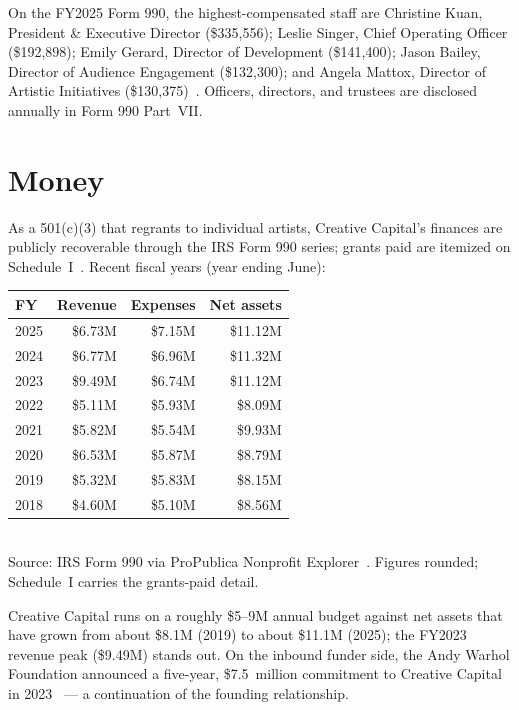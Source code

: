 \documentclass[10pt,letterpaper,twocolumn]{article}
\begin{document}
On the FY2025 Form 990, the highest-compensated staff are Christine Kuan, President \& Executive Director (\$335,556); Leslie Singer, Chief Operating Officer (\$192,898); Emily Gerard, Director of Development (\$141,400); Jason Bailey, Director of Audience Engagement (\$132,300); and Angela Mattox, Director of Artistic Initiatives (\$130,375)~\citep{ccpropublica}. Officers, directors, and trustees are disclosed annually in Form 990 Part~VII.

\section{Money}

As a 501(c)(3) that regrants to individual artists, Creative Capital's finances are publicly recoverable through the IRS Form 990 series; grants paid are itemized on Schedule~I~\citep{ccpropublica}. Recent fiscal years (year ending June):

\begin{table}[h]
\footnotesize
\centering
\setlength{\tabcolsep}{3pt}
\begin{tabularx}{\columnwidth}{lrrr}
\toprule
\textbf{FY} & \textbf{Revenue} & \textbf{Expenses} & \textbf{Net assets} \\
\midrule
2025 & \$6.73M & \$7.15M & \$11.12M \\
2024 & \$6.77M & \$6.96M & \$11.32M \\
2023 & \$9.49M & \$6.74M & \$11.12M \\
2022 & \$5.11M & \$5.93M & \$8.09M \\
2021 & \$5.82M & \$5.54M & \$9.93M \\
2020 & \$6.53M & \$5.87M & \$8.79M \\
2019 & \$5.32M & \$5.83M & \$8.15M \\
2018 & \$4.60M & \$5.10M & \$8.56M \\
\bottomrule
\end{tabularx}
\\[0.3em]
\footnotesize Source: IRS Form 990 via ProPublica Nonprofit Explorer~\citep{ccpropublica}. Figures rounded; Schedule~I carries the grants-paid detail.
\end{table}

Creative Capital runs on a roughly \$5--9M annual budget against net assets that have grown from about \$8.1M (2019) to about \$11.1M (2025); the FY2023 revenue peak (\$9.49M) stands out. On the inbound funder side, the Andy Warhol Foundation announced a five-year, \$7.5~million commitment to Creative Capital in 2023~\citep{ccwarhol2023} --- a continuation of the founding relationship.
\end{document}

